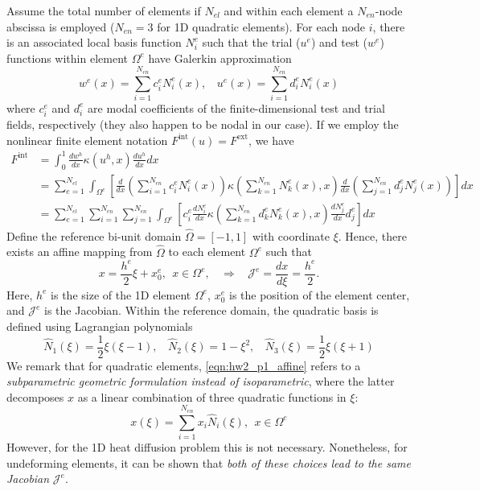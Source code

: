 Assume the total number of elements if $N_{el}$ and within each element a $N_{en}$-node abscissa is employed ($N_{en} = 3$ for 1D quadratic elements). For each node $i$, there is an associated local basis function $N_i^e$ such that the trial ($u^e$) and test ($w^e$) functions within element $\Omega^e$ have Galerkin approximation 
\begin{equation}
    w^e(x) = \sum_{i=1}^{N_{en}} c_i^e N_i^e(x), ~~~~ u^e(x) = \sum_{i=1}^{N_{en}} d_i^e N_i^e(x)
\end{equation}
where $c_i^e$ and $d_i^e$ are modal coefficients of the finite-dimensional test and trial fields, respectively (they also happen to be nodal in our case).
If we employ the nonlinear finite element notation $F^{\textrm{int}}(u) = F^{\textrm{ext}}$, we have 
\begin{equation}\label{eqn:hw2_p1_Fint}
\begin{aligned}
    F^{\textrm{int}} &= \int_0^1 \frac{dw^h}{dx} \kappa(u^h, x) \frac{du^h}{dx} dx \\
    &= \sum_{e=1}^{N_{el}}\int_{\Omega^e} 
        \left[ 
        \frac{d}{dx}\left(\sum_{i=1}^{N_{en}} c_i^e N_i^e(x)\right) 
        \kappa\left(\sum_{k=1}^{N_{en}} N_k^e(x), x\right) 
        \frac{d}{dx}\left(\sum_{j=1}^{N_{en}} d_j^e N_j^e(x)\right) 
        \right] dx \\
    &= \sum_{e=1}^{N_{el}}\sum_{i=1}^{N_{en}}\sum_{j=1}^{N_{en}} 
        \int_{\Omega^e} \left[ c_i^e \frac{dN_i^e}{dx} \kappa\left(\sum_{k=1}^{N_{en}} d_k^e N_k^e(x), x\right) \frac{dN_j^e}{dx} d_j^e \right] dx
\end{aligned}
\end{equation}
Define the reference bi-unit domain $\hat{\Omega} = [-1, 1]$ with coordinate $\xi$.
Hence, there exists an affine mapping from $\hat{\Omega}$ to each element $\Omega^e$ such that 
\begin{equation}\label{eqn:hw2_p1_affine}
    x = \frac{h^e}{2}\xi + x_0^e, ~~ x\in \Omega^e, ~~~~ \Rightarrow ~~~~ \mathcal{J}^e = \frac{dx}{d\xi} = \frac{h^e}{2}.
\end{equation}
Here, $h^e$ is the size of the 1D element $\Omega^e$, $x_0^e$ is the position of the element center, and $\mathcal{J}^e$ is the Jacobian. 
Within the reference domain, the quadratic basis is defined using Lagrangian polynomials
\begin{equation}\label{eqn:hw2_p1_quad_basis}
    \hat{N}_1(\xi) = \frac{1}{2}\xi(\xi - 1), ~~~~ 
    \hat{N}_2(\xi) = 1 - \xi^2, ~~~~ 
    \hat{N}_3(\xi) = \frac{1}{2}\xi(\xi + 1)
\end{equation}
We remark that for quadratic elements, \cref{eqn:hw2_p1_affine} refers to a \emph{subparametric geometric formulation instead of isoparametric}, where the latter decomposes $x$ as a linear combination of three quadratic functions in $\xi$:
\begin{equation}\label{eqn:hw2_p1_isoparametric}
    x(\xi) = \sum_{i=1}^{N_{en}} x_i \hat{N}_i(\xi), ~~ x \in \Omega^e
\end{equation}
However, for the 1D heat diffusion problem this is not necessary. 
Nonetheless, for undeforming elements, it can be shown that \emph{both of these choices lead to the same Jacobian} $\mathcal{J}^e$.

